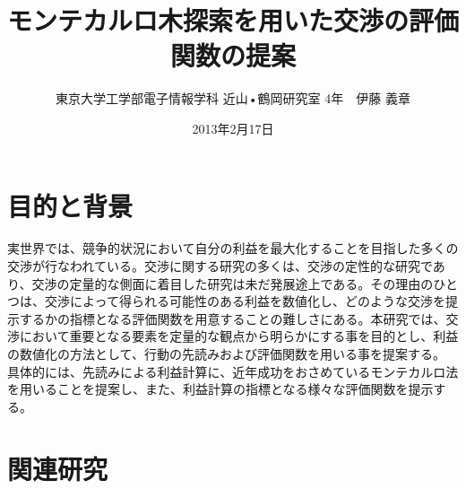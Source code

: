 \documentclass[a4, 10pt,dvipdfmx,twocolumn]{jsarticle}
\title{モンテカルロ木探索を用いた交渉の評価関数の提案}
\author{東京大学工学部電子情報学科 近山•鶴岡研究室 4年　伊藤 義章}
\date{2013年2月17日}
\begin{document}



\newpage
\maketitle


\section{目的と背景}

実世界では、競争的状況において自分の利益を最大化することを目指した多くの交渉が行なわれている。交渉に関する研究の多くは、交渉の定性的な研究であり、交渉の定量的な側面に着目した研究は未だ発展途上である。その理由のひとつは、交渉によって得られる可能性のある利益を数値化し、どのような交渉を提示するかの指標となる評価関数を用意することの難しさにある。本研究では、交渉において重要となる要素を定量的な観点から明らかにする事を目的とし、利益の数値化の方法として、行動の先読みおよび評価関数を用いる事を提案する。
具体的には、先読みによる利益計算に、近年成功をおさめているモンテカルロ法を用いることを提案し、また、利益計算の指標となる様々な評価関数を提示する。

\section{関連研究}
\end{document}
